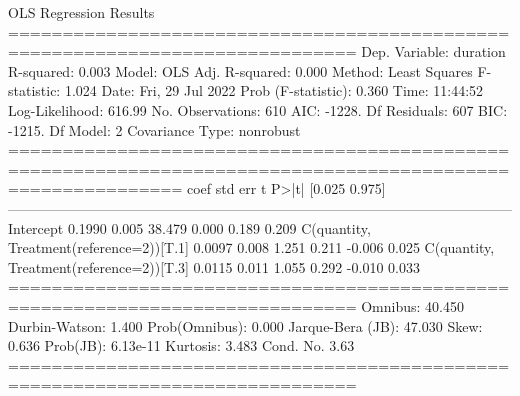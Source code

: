 OLS Regression Results  \\                          
============================================================================== 
Dep. Variable:               duration   R-squared:                       0.003
Model:                            OLS   Adj. R-squared:                  0.000
Method:                 Least Squares   F-statistic:                     1.024
Date:                Fri, 29 Jul 2022   Prob (F-statistic):              0.360
Time:                        11:44:52   Log-Likelihood:                 616.99
No. Observations:                 610   AIC:                            -1228.
Df Residuals:                     607   BIC:                            -1215.
Df Model:                           2                                         
Covariance Type:            nonrobust                                         
============================================================================================================
                                               coef    std err          t      P>|t|      [0.025      0.975]
------------------------------------------------------------------------------------------------------------
Intercept                                    0.1990      0.005     38.479      0.000       0.189       0.209
C(quantity, Treatment(reference=2))[T.1]     0.0097      0.008      1.251      0.211      -0.006       0.025
C(quantity, Treatment(reference=2))[T.3]     0.0115      0.011      1.055      0.292      -0.010       0.033
==============================================================================
Omnibus:                       40.450   Durbin-Watson:                   1.400
Prob(Omnibus):                  0.000   Jarque-Bera (JB):               47.030
Skew:                           0.636   Prob(JB):                     6.13e-11
Kurtosis:                       3.483   Cond. No.                         3.63
==============================================================================
\\

